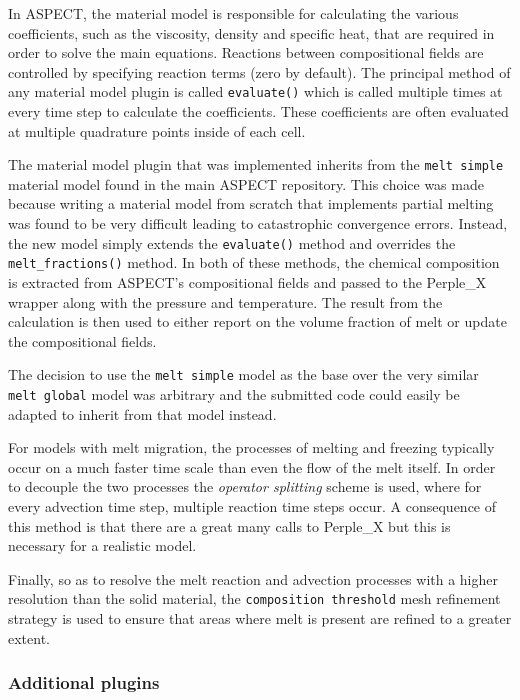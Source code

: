\vspace{5mm}

In ASPECT, the material model is responsible for calculating the various coefficients, such as the viscosity, density and specific heat, that are required in order to solve the main equations.
Reactions between compositional fields are controlled by specifying reaction terms (zero by default).
The principal method of any material model plugin is called \texttt{evaluate()} which is called multiple times at every time step to calculate the coefficients.
These coefficients are often evaluated at multiple quadrature points inside of each cell.

The material model plugin that was implemented inherits from the \texttt{melt simple} material model found in the main ASPECT repository.
This choice was made because writing a material model from scratch that implements partial melting was found to be very difficult leading to catastrophic convergence errors.
Instead, the new model simply extends the \texttt{evaluate()} method and overrides the \texttt{melt\_fractions()} method.
In both of these methods, the chemical composition is extracted from ASPECT's compositional fields and passed to the Perple\_X wrapper along with the pressure and \mbox{temperature}.
The result from the calculation is then used to either report on the volume fraction of melt or update the compositional fields.

The decision to use the \texttt{melt simple} model as the base over the very similar \texttt{melt global} model was arbitrary and the submitted code could easily be adapted to inherit from that model instead.

For models with melt migration, the processes of melting and freezing typically occur on a much faster time scale than even the flow of the melt itself.
In order to decouple the two processes the \textit{operator splitting} scheme is used, where for every advection time step, multiple reaction time steps occur.
A consequence of this method is that there are a great many calls to Perple\_X but this is necessary for a realistic model.

Finally, so as to resolve the melt reaction and advection processes with a higher resolution than the solid material, the \texttt{composition threshold} mesh refinement strategy is used to ensure that areas where melt is present are refined to a greater extent.

\subsubsection{Additional plugins}


